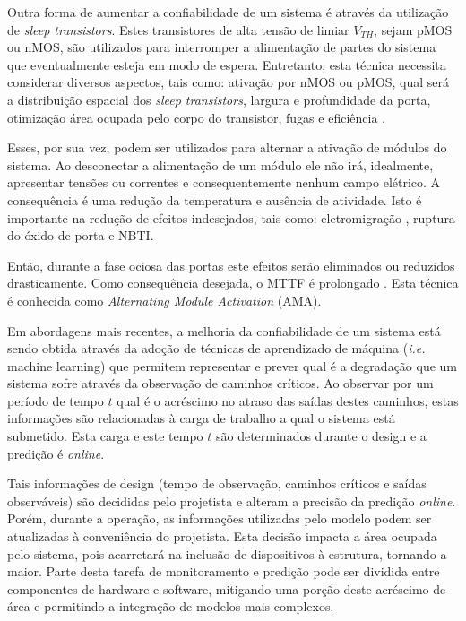 Outra forma de aumentar a confiabilidade de um sistema é através da utilização de \textit{sleep transistors}. Estes transistores de alta tensão de limiar $V_{TH}$, sejam pMOS ou nMOS, são utilizados para interromper a alimentação de partes do sistema que eventualmente esteja em modo de espera. Entretanto, esta técnica necessita considerar diversos aspectos, tais como: ativação por nMOS ou pMOS, qual será a distribuição espacial dos \textit{sleep transistors}, largura e profundidade da porta, otimização área ocupada pelo corpo do transistor, fugas e eficiência \cite{Shi}.

Esses, por sua vez, podem ser utilizados para alternar a ativação de módulos do sistema. Ao desconectar a alimentação de um módulo ele não irá, idealmente, apresentar tensões ou correntes e consequentemente nenhum campo elétrico. A consequência é uma redução da temperatura e ausência de atividade. Isto é importante na redução de efeitos indesejados, tais como: eletromigração \cite{Srinivasan2003}, ruptura do óxido de porta e NBTI.

Então, durante a fase ociosa das portas este efeitos serão eliminados ou reduzidos drasticamente. Como consequência desejada, o MTTF é prolongado \cite{Torres2013}. Esta técnica é conhecida como \textit{Alternating Module Activation} (AMA).

Em abordagens mais recentes, a melhoria da confiabilidade de um sistema está sendo obtida através da adoção de técnicas de aprendizado de máquina (\textit{i.e.} machine learning) que permitem representar e prever qual é a degradação que um sistema sofre através da observação de caminhos críticos. Ao observar por um período de tempo $t$ qual é o acréscimo no atraso das saídas destes caminhos, estas informações são relacionadas à carga de trabalho a qual o sistema está submetido. Esta carga e este tempo $t$ são determinados durante o design e a predição é \textit{online}.

Tais informações de design (tempo de observação, caminhos críticos e saídas observáveis) são decididas pelo projetista e alteram a precisão da predição \textit{online}. Porém, durante a operação, as informações utilizadas pelo modelo podem ser atualizadas à conveniência do projetista. Esta decisão impacta a área ocupada pelo sistema, pois acarretará na inclusão de dispositivos à estrutura, tornando-a maior. Parte desta tarefa de monitoramento e predição pode ser dividida entre componentes de hardware e software, mitigando uma porção deste acréscimo de área e permitindo a integração de modelos mais complexos.

